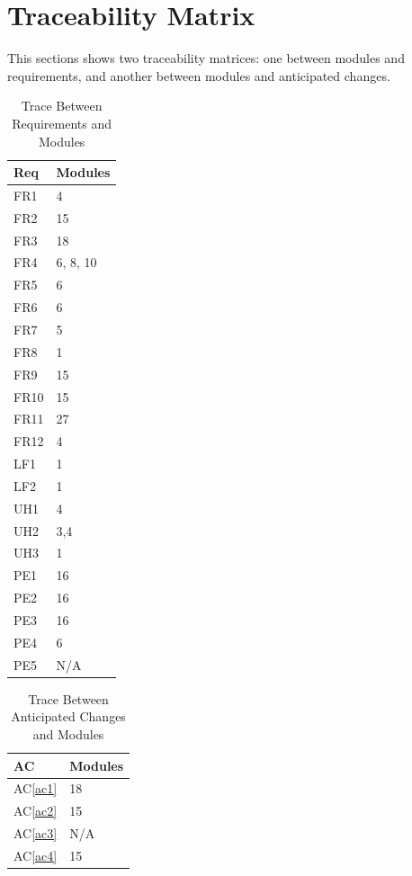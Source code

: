 \documentclass[12pt, titlepage]{article}
\newcommand{\acref}[1]{AC\ref{#1}}
\begin{document}
\section{Traceability Matrix}
This sections shows two traceability matrices: one between modules and requirements, and another between modules and anticipated changes.  
\begin{table}[htbp]
\centering
\begin{tabular}{p{} p{}}
\toprule
\textbf{Req} & \textbf{Modules}\\
\midrule
FR1 & 4\\
FR2 & 15\\
FR3 & 18\\
FR4 & 6, 8, 10\\
FR5 & 6 \\
FR6 & 6 \\
FR7 & 5 \\
FR8 & 1 \\
FR9 & 15 \\
FR10 & 15 \\
FR11 & 27 \\
FR12 & 4 \\
LF1 & 1 \\
LF2 & 1 \\
UH1 & 4\\
UH2 & 3,4\\
UH3 & 1\\
PE1 & 16 \\
PE2 & 16 \\
PE3 & 16 \\
PE4 & 6 \\
PE5 & N/A\\


\bottomrule
\end{tabular}
\caption{Trace Between Requirements and Modules}
\label{TblACT}
\end{table}





\begin{table}[htbp]
\centering
\begin{tabular}{p{} p{}}
\toprule
\textbf{AC} & \textbf{Modules}\\
\midrule
\acref{ac1} & 18\\
\acref{ac2} & 15\\
\acref{ac3} & N/A\\
\acref{ac4} & 15\\

\bottomrule
\end{tabular}
\caption{Trace Between Anticipated Changes and Modules}
\label{TblACT}
\end{table}
\end{document}
